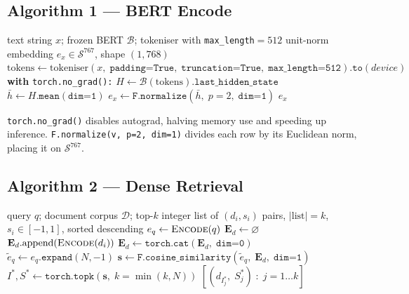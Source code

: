 \documentclass[12pt,a4paper]{article}
\theoremstyle{definition}
\theoremstyle{plain}
\theoremstyle{remark}
\begin{document}
\subsection{Algorithm 1 --- BERT Encode}

\begin{algorithm}[H]
\caption{\textsc{Encode}$(x)$ --- BERT + Mean Pool + L2 Normalise}
\label{alg:encode}
\begin{algorithmic}[1]
\Require text string $x$; frozen BERT $\mathcal{B}$;
         tokeniser with \texttt{max\_length}$=512$
\Ensure unit-norm embedding $e_x \in \mathcal{S}^{767}$, shape $(1, 768)$
\State $\text{tokens} \gets \text{tokeniser}(x,\;
  \texttt{padding=True},\;
  \texttt{truncation=True},\;
  \texttt{max\_length=512}).\texttt{to}(\textit{device})$
\State \textbf{with} \texttt{torch.no\_grad():}
\State \quad $H \gets \mathcal{B}(\text{tokens}).\texttt{last\_hidden\_state}$
\State $\bar{h} \gets H.\texttt{mean}(\texttt{dim=1})$
\State $e_x \gets \texttt{F.normalize}(\bar{h},\; p=2,\; \texttt{dim=1})$
\State \Return $e_x$
\end{algorithmic}
\end{algorithm}

\begin{tcolorbox}[techbox]
\texttt{torch.no\_grad()} disables autograd, halving memory use and
speeding up inference.  \texttt{F.normalize(v, p=2, dim=1)} divides
each row by its Euclidean norm, placing it on $\mathcal{S}^{767}$.
\end{tcolorbox}

\subsection{Algorithm 2 --- Dense Retrieval}

\begin{algorithm}[H]
\caption{\textsc{DenseRetrieval}$(q,\, \mathcal{D},\, k)$}
\label{alg:dense}
\begin{algorithmic}[1]
\Require query $q$; document corpus $\mathcal{D}$; top-$k$ integer
\Ensure list of $(d_i, s_i)$ pairs, $|\text{list}|=k$,
        $s_i \in [-1, 1]$, sorted descending
\State $e_q \gets \textsc{Encode}(q)$
\State $\mathbf{E}_d \gets \varnothing$
  \State $\mathbf{E}_d.\text{append}(\textsc{Encode}(d_i))$
\EndFor
\State $\mathbf{E}_d \gets \texttt{torch.cat}(\mathbf{E}_d,\; \texttt{dim=0})$
\State $\tilde{e}_q \gets e_q.\texttt{expand}(N, -1)$
\State $\bm{s} \gets \texttt{F.cosine\_similarity}(\tilde{e}_q,\; \mathbf{E}_d,\; \texttt{dim=1})$
\State $I^*, S^* \gets \texttt{torch.topk}(\bm{s},\; k=\min(k, N))$
\State \Return $[(d_{I^*_j},\; S^*_j)\;:\; j=1\ldots k]$
\end{algorithmic}
\end{algorithm}
\end{document}
